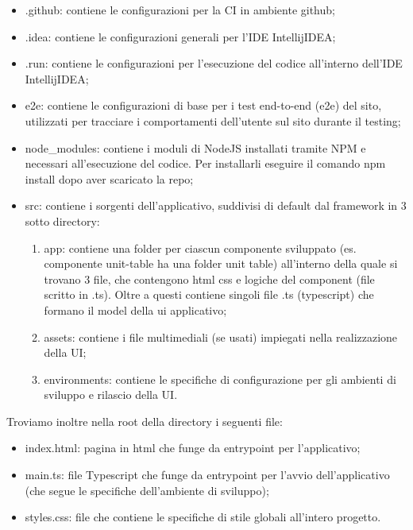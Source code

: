 	\begin{itemize}
		\item{.github}: contiene le configurazioni per la CI in ambiente github;
		\item{.idea}: contiene le configurazioni generali per l'IDE IntellijIDEA;
		\item{.run}: contiene le configurazioni per l'esecuzione del codice all'interno	dell'IDE IntellijIDEA;
		\item{e2e}: contiene le configurazioni di base per i test end-to-end (e2e) del sito, utilizzati per tracciare i comportamenti dell'utente sul sito durante il testing;
		\item{node\_modules}: contiene i moduli di NodeJS installati tramite NPM e necessari all'esecuzione del codice. Per installarli eseguire il comando npm install dopo aver scaricato la repo;
		\item{src}: contiene i sorgenti dell'applicativo, suddivisi di default dal framework in 3 sotto	directory:
		\begin{enumerate}
			\item{app}: contiene una folder per ciascun componente sviluppato (es. componente unit-table ha una folder unit table) all'interno della quale si trovano 3 file, che contengono html css e logiche del component (file scritto in .ts). Oltre a questi	contiene singoli file .ts (typescript) che formano il model della ui applicativo;
			\item{assets}: contiene i file multimediali (se usati) impiegati nella realizzazione della UI;
			\item{environments}: contiene le specifiche di configurazione per gli ambienti di sviluppo e rilascio della UI.
		\end{enumerate}
	\end{itemize}

	Troviamo inoltre nella root della directory i seguenti file:
	\begin{itemize}
		\item{index.html}: pagina in html che funge da entrypoint per l'applicativo;
		\item{main.ts}: file Typescript che funge da entrypoint per l'avvio dell'applicativo (che segue le specifiche dell'ambiente di sviluppo);
		\item{styles.css}: file che contiene le specifiche di stile globali all'intero progetto.
	\end{itemize}

